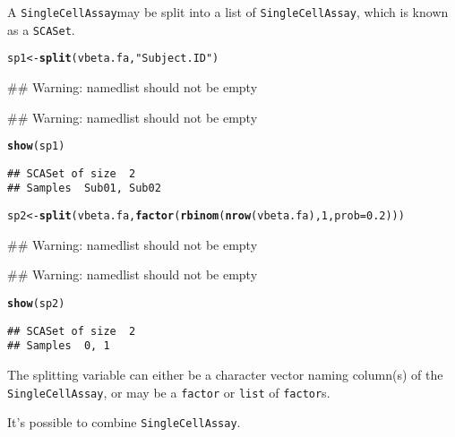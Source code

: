 \documentclass{article}\usepackage{graphicx, color}
\makeatletter
\newcommand{\hlfunctioncall}[1]{\textcolor[rgb]{0.501960784313725,0,0.329411764705882}{\textbf{#1}}}%
\newcommand{\hlstring}[1]{\textcolor[rgb]{0.6,0.6,1}{#1}}%
\newenvironment{kframe}{%
 \def\at@end@of@kframe{}%
 \ifinner\ifhmode%
  \def\at@end@of@kframe{\end{minipage}}%
  \begin{minipage}{\columnwidth}%
 \fi\fi%
 \def\FrameCommand##1{\hskip\@totalleftmargin \hskip-\fboxsep
 \colorbox{shadecolor}{##1}\hskip-\fboxsep
     \hskip-\linewidth \hskip-\@totalleftmargin \hskip\columnwidth}%
 \MakeFramed {\advance\hsize-\width
   \@totalleftmargin\z@ \linewidth\hsize
   \@setminipage}}%
 {\par\unskip\endMakeFramed%
 \at@end@of@kframe}
\newenvironment{knitrout}{}{} %
\newcommand{\sca}{\texttt{SingleCellAssay}}
\makeatother
\begin{document}
A \sca may be split into a list of \sca, which is known as a \texttt{SCASet}.
\begin{knitrout}
\color{fgcolor}\begin{kframe}
\begin{alltt}
sp1 <- \hlfunctioncall{split}(vbeta.fa, \hlstring{"Subject.ID"})
\end{alltt}
\begin{flushleft}\ttfamily\noindent\textcolor{warningcolor}{\#\# Warning: namedlist should not be empty}\end{flushleft}\begin{flushleft}\ttfamily\noindent\textcolor{warningcolor}{\#\# Warning: namedlist should not be empty}\end{flushleft}\begin{alltt}
\hlfunctioncall{show}(sp1)
\end{alltt}
\begin{verbatim}
## SCASet of size  2 
## Samples  Sub01, Sub02 
\end{verbatim}
\begin{alltt}
sp2 <- \hlfunctioncall{split}(vbeta.fa, \hlfunctioncall{factor}(\hlfunctioncall{rbinom}(\hlfunctioncall{nrow}(vbeta.fa), 1, prob = 0.2)))
\end{alltt}
\begin{flushleft}\ttfamily\noindent\textcolor{warningcolor}{\#\# Warning: namedlist should not be empty}\end{flushleft}\begin{flushleft}\ttfamily\noindent\textcolor{warningcolor}{\#\# Warning: namedlist should not be empty}\end{flushleft}\begin{alltt}
\hlfunctioncall{show}(sp2)
\end{alltt}
\begin{verbatim}
## SCASet of size  2 
## Samples  0, 1 
\end{verbatim}
\end{kframe}
\end{knitrout}

The splitting variable can either be a character vector naming column(s) of the \sca, or may be a \texttt{factor} or \texttt{list} of \texttt{factor}s.

It's possible to combine \sca.
\end{document}
